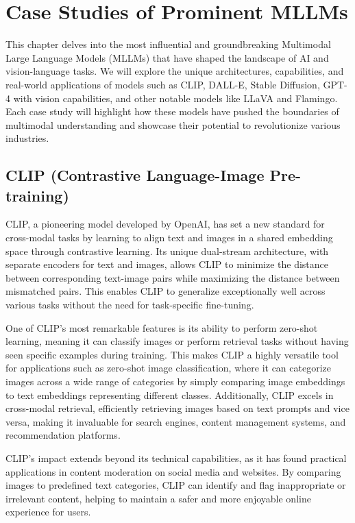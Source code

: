 \chapter{Case Studies of Prominent MLLMs}

This chapter delves into the most influential and groundbreaking Multimodal Large Language Models (MLLMs) that have shaped the landscape of AI and vision-language tasks. We will explore the unique architectures, capabilities, and real-world applications of models such as CLIP, DALL-E, Stable Diffusion, GPT-4 with vision capabilities, and other notable models like LLaVA and Flamingo. Each case study will highlight how these models have pushed the boundaries of multimodal understanding and showcase their potential to revolutionize various industries.

\section{CLIP (Contrastive Language-Image Pre-training)}

CLIP, a pioneering model developed by OpenAI, has set a new standard for cross-modal tasks by learning to align text and images in a shared embedding space through contrastive learning. Its unique dual-stream architecture, with separate encoders for text and images, allows CLIP to minimize the distance between corresponding text-image pairs while maximizing the distance between mismatched pairs. This enables CLIP to generalize exceptionally well across various tasks without the need for task-specific fine-tuning.

One of CLIP's most remarkable features is its ability to perform zero-shot learning, meaning it can classify images or perform retrieval tasks without having seen specific examples during training. This makes CLIP a highly versatile tool for applications such as zero-shot image classification, where it can categorize images across a wide range of categories by simply comparing image embeddings to text embeddings representing different classes. Additionally, CLIP excels in cross-modal retrieval, efficiently retrieving images based on text prompts and vice versa, making it invaluable for search engines, content management systems, and recommendation platforms.

CLIP's impact extends beyond its technical capabilities, as it has found practical applications in content moderation on social media and websites. By comparing images to predefined text categories, CLIP can identify and flag inappropriate or irrelevant content, helping to maintain a safer and more enjoyable online experience for users.

